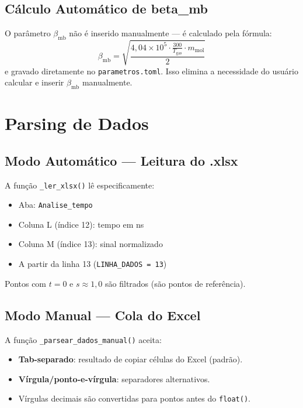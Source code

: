 \documentclass[12pt,a4paper]{report}
\newcommand{\code}[1]{\texttt{#1}}
\begin{document}
\subsection{Cálculo Automático de beta\_mb}

O parâmetro $\beta_{\text{mb}}$ não é inserido manualmente — é calculado
pela fórmula:
\begin{equation}
  \beta_{\text{mb}} = \sqrt{\frac{4{,}04 \times 10^5 \cdot \frac{300}{T_{\text{gas}}} \cdot m_{\text{mol}}}{2}}
\end{equation}
e gravado diretamente no \texttt{parametros.toml}. Isso elimina a necessidade
do usuário calcular e inserir $\beta_{\text{mb}}$ manualmente.

\section{Parsing de Dados}

\subsection{Modo Automático — Leitura do .xlsx}

A função \code{\_ler\_xlsx()} lê especificamente:
\begin{itemize}
  \item Aba: \texttt{Analise\_tempo}
  \item Coluna L (índice 12): tempo em ns
  \item Coluna M (índice 13): sinal normalizado
  \item A partir da linha 13 (\code{LINHA\_DADOS = 13})
\end{itemize}

Pontos com $t = 0$ e $s \approx 1{,}0$ são filtrados (são pontos de referência).

\subsection{Modo Manual — Cola do Excel}

A função \code{\_parsear\_dados\_manual()} aceita:
\begin{itemize}
  \item \textbf{Tab-separado}: resultado de copiar células do Excel (padrão).
  \item \textbf{Vírgula/ponto-e-vírgula}: separadores alternativos.
  \item Vírgulas decimais são convertidas para pontos antes do \code{float()}.
\end{itemize}
\end{document}
